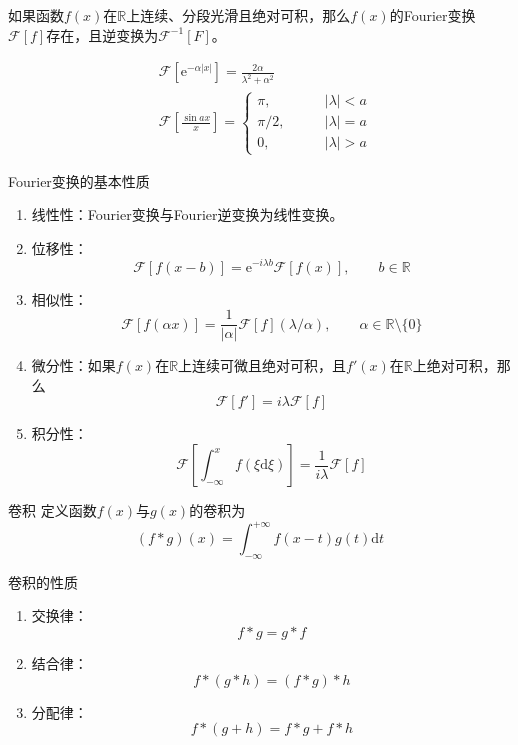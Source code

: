 \documentclass[lang = cn, scheme = chinese, thmcnt = section]{elegantbook}
\newcommand{\R}{\mathbb{R}}            %
\newcommand{\dd}{\mathrm{d}}           %
\newcommand{\ee}[1]{\mathrm{e}^{#1}}   %
\begin{document}
\begin{theorem}
	如果函数$f(x)$在$\R$上连续、分段光滑且绝对可积，那么$f(x)$的Fourier变换$\mathscr{F}[f]$存在，且逆变换为$\mathscr{F}^{-1}[F]$。
\end{theorem}

\begin{theorem}
	\begin{align*}
		& \mathscr{F}\left[\ee{-\alpha|x|}\right]=\frac{2\alpha}{\lambda^2+\alpha^2}\\
		& \mathscr{F}\left[\frac{\sin ax}{x}\right]=\begin{cases}
			\pi,\qquad & |\lambda|<a\\
			\pi/2,\qquad & |\lambda|=a\\
			0,\qquad & |\lambda|>a
		\end{cases}
	\end{align*}
\end{theorem}

\begin{proposition}{Fourier变换的基本性质}
	\begin{enumerate}
		\item 线性性：Fourier变换与Fourier逆变换为线性变换。
		\item 位移性：%
		$$
		\mathscr{F}[f(x-b)]=\ee{-i\lambda b}\mathscr{F}[f(x)],\qquad b\in\R
		$$
		\item 相似性：%
		$$
		\mathscr{F}[f(\alpha x)]=\frac{1}{|\alpha|}\mathscr{F}[f](\lambda/\alpha),\qquad \alpha\in\R\setminus\{0\}
		$$
		\item 微分性：如果$f(x)$在$\R$上连续可微且绝对可积，且$f'(x)$在$\R$上绝对可积，那么%
		$$
		\mathscr{F}[f']=i\lambda \mathscr{F}[f]
		$$
		\item 积分性：%
		$$
		\mathscr{F}\left[\int_{-\infty}^{x}f(\xi\dd\xi)\right]=\frac{1}{i\lambda}\mathscr{F}[f]
		$$
	\end{enumerate}
\end{proposition}

\begin{definition}{卷积}
	定义函数$f(x)$与$g(x)$的卷积为%
	$$
	(f*g)(x)=\int_{-\infty}^{+\infty}f(x-t)g(t)\dd t
	$$
\end{definition}

\begin{proposition}{卷积的性质}
	\begin{enumerate}
		\item 交换律：%
		$$
		f*g=g*f
		$$
		\item 结合律：%
		$$
		f*(g*h)=(f*g)*h
		$$
		\item 分配律：%
		$$
		f*(g+h)=f*g+f*h
		$$
	\end{enumerate}
\end{proposition}
\end{document}
